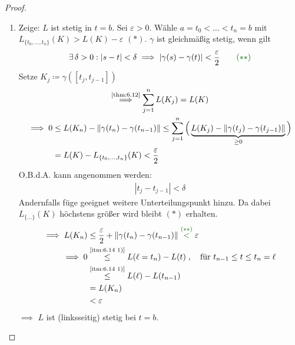 \documentclass[a4paper,10pt]{scrbook}
\begin{document}
\begin{theorem}[Hilfssatz]
\begin{proof}
\begin{enum-arab}
      \item \label{itm:6.14 2)}
      \begin{enumerate}
        \item \label{itm:6.14 2)a}Zeige: $L$ ist stetig in $t=b$. Sei $\varepsilon > 0$. Wähle $a = t_0 < \ldots < t_n = b$ mit $L_{\{t_0,\ldots,t_n\}}(K) > L(K) - \varepsilon$ {\color{DarkRed} $(*)$}. $\gamma$ ist gleichmäßig stetig, wenn gilt
        \begin{align*}
          \exists \, \delta > 0 : |s-t| < \delta \implies |\gamma(s) - \gamma(t)| < \frac{\varepsilon}{2} \tag*{\color{DarkGreen} $(**)$}
        \end{align*}
        Setze $K_j \coloneq \gamma([t_j,t_{j-1}])$
        \begin{gather*}
          \overset{\text{\ref{thm:6.12}}}{\implies} \sum\limits_{j=1}^{n} L(K_j) = L(K) \\
          \begin{aligned}
            \implies 0 &\leq L(K_n) - \|\gamma(t_n)-\gamma(t_{n-1})\|
            \leq \sum\limits_{j=1}^{n} \Big( \underbrace{L(K_j) - \|\gamma(t_j)-\gamma(t_{j-1})\|}_{\geq 0} \Big) \\
            &= L(K) - L_{\{t_0,\ldots,t_n\}}(K) < \frac{\varepsilon}{2}
          \end{aligned}
        \end{gather*}
        O.B.d.A. kann angenommen werden:
        \begin{align*}
          |t_j - t_{j-1}| < \delta
        \end{align*}
        Andernfalls füge geeignet weitere Unterteilungspunkt hinzu. Da dabei $L_{\{\ldots\}}(K)$ höchstens größer wird bleibt {\color{DarkRed} $(*)$} erhalten.
        \begin{align*}
          \implies L(K_n) &\leq \frac{\varepsilon}{2} + \|\gamma(t_n) - \gamma(t_{n-1})\| \overset{\color{DarkGreen} (**)}{<} \varepsilon \\
          \implies 0 &\overset{\text{\ref{itm:6.14 1)}}}{\leq} L(\ell = t_n) - L(t) \; , \quad \text{für } t_{n-1} \leq t \leq t_n = \ell \\
          &\overset{\text{\ref{itm:6.14 1)}}}{\leq} L(\ell) - L(t_{n-1}) \\
          &= L(K_n) \\
          &< \varepsilon
        \end{align*}
        $\implies$ $L$ ist (linksseitig) stetig bei $t=b$.


\end{enumerate}
\end{enum-arab}
\end{proof}
\end{theorem}
\end{document}
